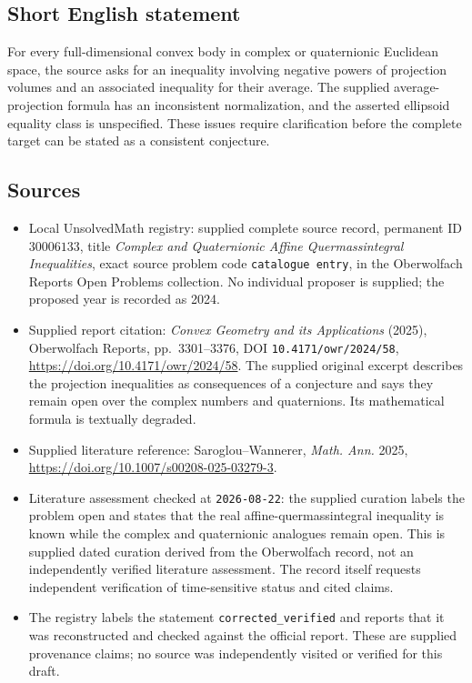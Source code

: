 \documentclass[11pt]{article}
\begin{document}
\subsection{Short English statement}
For every full-dimensional convex body in complex or quaternionic Euclidean space, the source asks for an inequality involving negative powers of projection volumes and an associated inequality for their average. The supplied average-projection formula has an inconsistent normalization, and the asserted ellipsoid equality class is unspecified. These issues require clarification before the complete target can be stated as a consistent conjecture.
\subsection{Sources}
\begin{itemize}
\item Local UnsolvedMath registry: supplied complete source record, permanent ID \(30006133\), title \emph{Complex and Quaternionic Affine Quermassintegral Inequalities}, exact source problem code \texttt{catalogue entry}, in the Oberwolfach Reports Open Problems collection. No individual proposer is supplied; the proposed year is recorded as 2024.
\item Supplied report citation: \emph{Convex Geometry and its Applications} (2025), Oberwolfach Reports, pp.\ 3301--3376, DOI \texttt{10.4171/owr/2024/58}, \url{https://doi.org/10.4171/owr/2024/58}. The supplied original excerpt describes the projection inequalities as consequences of a conjecture and says they remain open over the complex numbers and quaternions. Its mathematical formula is textually degraded.
\item Supplied literature reference: Saroglou--Wannerer, \emph{Math. Ann.} 2025, \url{https://doi.org/10.1007/s00208-025-03279-3}.
\item Literature assessment checked at \texttt{2026-08-22}: the supplied curation labels the problem open and states that the real affine-quermassintegral inequality is known while the complex and quaternionic analogues remain open. This is supplied dated curation derived from the Oberwolfach record, not an independently verified literature assessment. The record itself requests independent verification of time-sensitive status and cited claims.
\item The registry labels the statement \texttt{corrected\_verified} and reports that it was reconstructed and checked against the official report. These are supplied provenance claims; no source was independently visited or verified for this draft.
\end{itemize}
\end{document}
